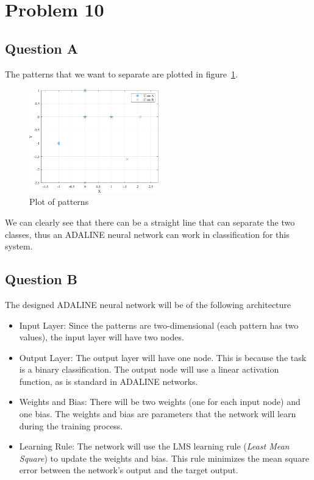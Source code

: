 \section{Problem 10}

\subsection{Question A}

The patterns that we want to separate are plotted in figure~\ref{fig:prob_10_patterns}.

\begin{figure}[H]
	\centering
	\includegraphics[width=0.5\textwidth]{../Problem 10/patterns.pdf}
	\caption{Plot of patterns}
	\label{fig:prob_10_patterns}
\end{figure}

We can clearly see that there can be a straight line that can separate the two classes, thus an ADALINE neural network can work in classification for this system.

\subsection{Question B}

The designed ADALINE neural network will be of the following architecture
\begin{itemize}
	\item Input Layer: Since the patterns are two-dimensional (each pattern has two values), the input layer will have two nodes.
	\item Output Layer: The output layer will have one node. This is because the task is a binary classification. The output node will use a linear activation function, as is standard in ADALINE networks.
	\item Weights and Bias: There will be two weights (one for each input node) and one bias. The weights and bias are parameters that the network will learn during the training process.
	\item Learning Rule: The network will use the LMS learning rule (\textit{Least Mean Square}) to update the weights and bias. This rule minimizes the mean square error between the network's output and the target output.
\end{itemize}

